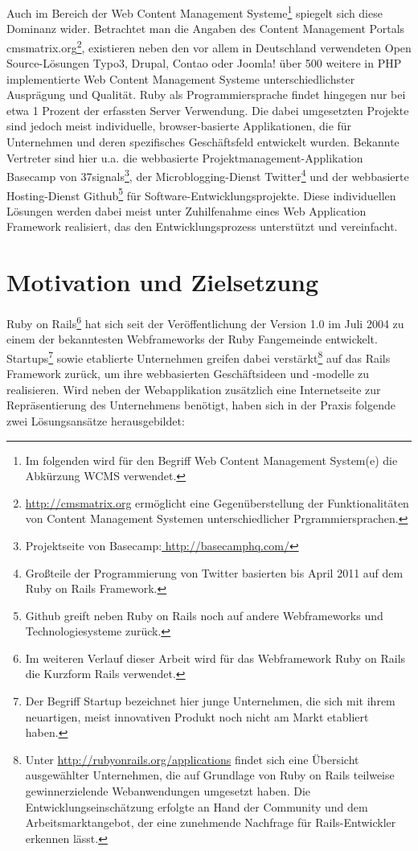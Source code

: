 Auch im Bereich der Web Content Management Systeme\footnote{Im folgenden wird für den Begriff Web Content Management System(e) die Abkürzung WCMS verwendet.} spiegelt sich diese Dominanz wider. Betrachtet man die Angaben des Content Management Portals cmsmatrix.org\footnote{\href{http://cmsmatrix.org}{http://cmsmatrix.org} ermöglicht eine Gegenüberstellung der Funktionalitäten von Content Management Systemen unterschiedlicher Prgrammiersprachen.}, existieren neben den vor allem in Deutschland verwendeten Open Source-Lösungen Typo3, Drupal, Contao oder Joomla! über 500 weitere in PHP implementierte Web Content Management Systeme unterschiedlichster Ausprägung und Qualität.
Ruby als Programmiersprache findet hingegen nur bei etwa 1 Prozent der erfassten Server Verwendung. Die dabei umgesetzten Projekte sind jedoch meist individuelle, browser-basierte Applikationen, die für Unternehmen und deren spezifisches Geschäftsfeld entwickelt wurden. Bekannte Vertreter sind hier u.a. die webbasierte Projektmanagement-Applikation Basecamp von 37signals\footnote{Projektseite von Basecamp:\href{http://basecamphq.com}{ http://basecamphq.com/}}, der Microblogging-Dienst Twitter\footnote{
Großteile der Programmierung von Twitter basierten bis April 2011 auf dem Ruby on Rails Framework.} und der webbasierte Hosting-Dienst Github\footnote{Github greift neben Ruby on Rails noch auf andere Webframeworks und Technologiesysteme zurück.} für Software-Entwicklungsprojekte.
Diese individuellen Lösungen werden dabei meist unter Zuhilfenahme eines Web Application Framework realisiert, das den Entwicklungsprozess unterstützt und vereinfacht.
\section{Motivation und Zielsetzung}
Ruby on Rails\footnote{Im weiteren Verlauf dieser Arbeit wird für das Webframework Ruby on Rails die Kurzform Rails verwendet.} hat sich seit der Veröffentlichung der Version 1.0 im Juli 2004 zu einem der bekanntesten Webframeworks der Ruby Fangemeinde entwickelt.
Startups\footnote{Der Begriff Startup bezeichnet hier junge Unternehmen, die sich mit ihrem neuartigen, meist innovativen Produkt noch nicht am Markt etabliert haben.} sowie etablierte Unternehmen greifen dabei verstärkt\footnote{Unter \href{http://rubyonrails.org/applications}{http://rubyonrails.org/applications} findet sich eine Übersicht ausgewählter Unternehmen, die auf Grundlage von Ruby on Rails teilweise gewinnerzielende Webanwendungen umgesetzt  haben. Die Entwicklungseinschätzung erfolgte an Hand der Community und dem Arbeitsmarktangebot, der eine zunehmende Nachfrage für Rails-Entwickler erkennen lässt.} auf das Rails Framework zurück, um ihre webbasierten Geschäftsideen und -modelle zu realisieren.
Wird neben der Webapplikation zusätzlich eine Internetseite zur Repräsentierung des Unternehmens benötigt, haben sich in der Praxis folgende zwei Lösungsansätze herausgebildet:

